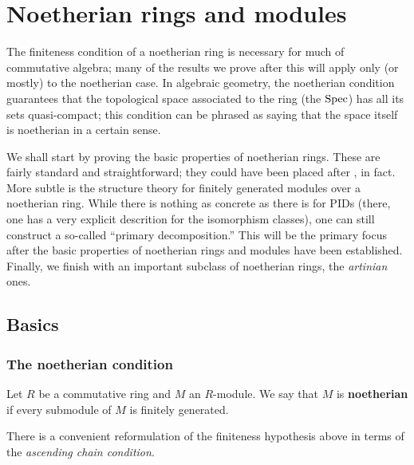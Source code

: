 \chapter{Noetherian rings and modules}
\label{noetherian}

The finiteness condition of a noetherian ring is necessary for much of
commutative algebra; many of the results we prove after this will apply only (or mostly) to the
noetherian case. In algebraic geometry, the noetherian condition guarantees
that the topological space associated to the ring (the $\operatorname{Spec} $) has all its
sets quasi-compact; this condition can be phrased as saying that the space
itself is noetherian in a certain sense. 

We shall start by proving the basic properties of noetherian rings. These are
fairly standard and straightforward; they could have been placed after
, in fact. More subtle is the structure theory for
finitely generated modules over a noetherian ring. While there is nothing as
concrete as there is for PIDs (there, one has a very explicit descrition for
the isomorphism classes), one can still construct a so-called ``primary
decomposition.'' This will be the primary focus after the basic properties of
noetherian rings and modules have been established. Finally, we finish with an
important subclass of noetherian rings, the \emph{artinian} ones.


\section{Basics}

\subsection{The noetherian condition}


\begin{definition} 
Let $R$ be a commutative ring and $M$ an $R$-module. We say that $M$ is
\textbf{noetherian} if every submodule of $M$ is finitely generated.
\end{definition} 


There is a convenient
reformulation of the finiteness hypothesis above in terms of the
\emph{ascending chain condition}.

